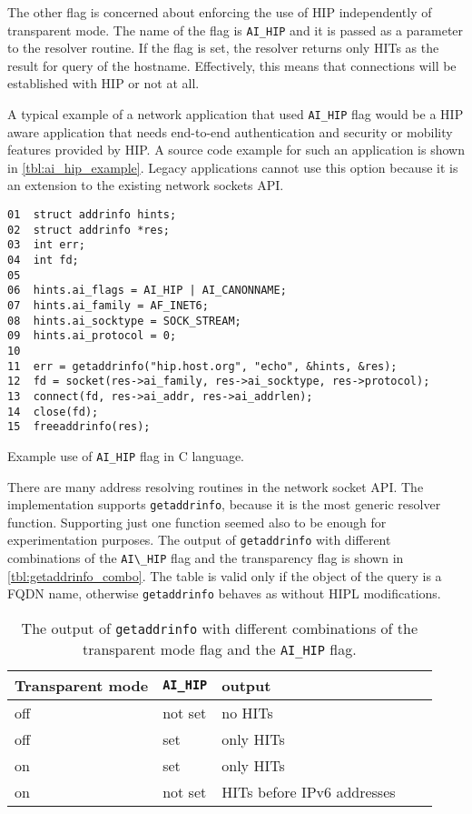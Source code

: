 The other flag is concerned about enforcing the use of \ac{HIP}
independently of transparent mode. The name of the flag is
\verb|AI_HIP| and it is passed as a parameter to the resolver
routine. If the flag is set, the resolver returns only \acp{HIT} as the
result for query of the hostname. Effectively, this means that
connections will be established with \ac{HIP} or not at all.

A typical example of a network application that used \verb|AI_HIP|
flag would be a \ac{HIP} aware application that needs end-to-end
authentication and security or mobility features provided by
\ac{HIP}. A source code example for such an application is shown in
\autoref{tbl:ai_hip_example}. Legacy applications cannot use this
option because it is an extension to the existing network sockets API.

\begin{table}[hbt]
\begin{verbatim}
01  struct addrinfo hints;
02  struct addrinfo *res;
03  int err;
04  int fd;
05
06  hints.ai_flags = AI_HIP | AI_CANONNAME;
07  hints.ai_family = AF_INET6;
08  hints.ai_socktype = SOCK_STREAM;
09  hints.ai_protocol = 0;
10
11  err = getaddrinfo("hip.host.org", "echo", &hints, &res);
12  fd = socket(res->ai_family, res->ai_socktype, res->protocol);
13  connect(fd, res->ai_addr, res->ai_addrlen);
14  close(fd);
15  freeaddrinfo(res);
\end{verbatim}
\caption{Example use of \texttt{AI\_HIP} flag in C language.}
\label{tbl:ai_hip_example}
\end{table}

There are many address resolving routines in the network socket
\ac{API}. The implementation supports \verb|getaddrinfo|, because it
is the most generic resolver function. Supporting just one function
seemed also to be enough for experimentation purposes. The output of
\verb|getaddrinfo| with different combinations of the \verb|AI\_HIP|
flag and the transparency flag is shown in
\autoref{tbl:getaddrinfo_combo}. The table is valid only if the object
of the query is a \ac{FQDN} name, otherwise \verb|getaddrinfo| behaves
as without \ac{HIPL} modifications.

\begin{table}[htb]
\centering
\begin{tabular}{|l|l|l|l|l|} \hline
Transparent mode & \verb|AI_HIP|  & output                   \\\hline
off        & not set        & no HITs                    \\
off        & set            & only HITs                  \\
on         & set            & only HITs                  \\
on         & not set        & HITs before IPv6 addresses \\
\hline
\end{tabular}
\caption{The output of \texttt{getaddrinfo} with different combinations of
the transparent mode flag and the \texttt{AI\_HIP} flag. }
\label{tbl:getaddrinfo_combo}
\end{table}

